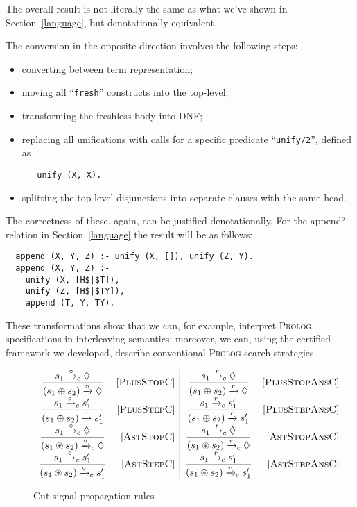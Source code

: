 {The overall result is not literally the same as what we've shown in Section~\ref{language}, but denotationally equivalent.

The conversion in the opposite direction involves the following steps:

\begin{itemize}
  \item converting between term representation;
  \item moving all ``\lstinline|fresh|'' constructs into the top-level;
  \item transforming the freshless body into DNF;
  \item replacing all unifications with calls for a specific predicate ``\lstinline|unify/2|'', defined as

\begin{lstlisting}
   unify (X, X).
\end{lstlisting}    

  \item splitting the top-level disjunctions into separate clauses with the same head.
\end{itemize}

The correctness of these, again, can be justified denotationally. For the append$^o$ relation in Section~\ref{language} the result
will be as follows:

\begin{lstlisting}
  append (X, Y, Z) :- unify (X, []), unify (Z, Y).
  append (X, Y, Z) :-
    unify (X, [H$|$T]),
    unify (Z, [H$|$TY]),
    append (T, Y, TY).
\end{lstlisting}

}

These transformations show that we can, for example, interpret \textsc{Prolog} specifications in interleaving semantics; moreover, we can,
using the certified framework we developed, describe conventional \textsc{Prolog} search strategies.

\begin{figure*}
\[
\begin{array}{cr|cr}
  \dfrac{s_1 \xrightarrow{\circ}_c \Diamond}{(s_1 \oplus s_2) \xrightarrow{\circ} \Diamond} & \mbox{[\textsc{PlusStopC}]}&
  \dfrac{s_1 \xrightarrow{r}_c \Diamond}{(s_1 \oplus s_2) \xrightarrow{r} \Diamond} & \mbox{[\textsc{PlusStopAnsC}]}\\
  \dfrac{s_1 \xrightarrow{\circ}_c s'_1}{(s_1 \oplus s_2) \xrightarrow{\circ} s'_1} &\mbox{[\textsc{PlusStepC}]}&
  \dfrac{s_1 \xrightarrow{r}_c s'_1}{(s_1 \oplus s_2) \xrightarrow{r} s'_1} &\mbox{[\textsc{PlusStepAnsC}]}\\
  \dfrac{s_1 \xrightarrow{\circ}_c \Diamond}{(s_1 \circledast s_2) \xrightarrow{\circ}_c \Diamond} & \mbox{[\textsc{AstStopC}]}&
  \dfrac{s_1 \xrightarrow{r}_c \Diamond}{(s_1 \circledast s_2) \xrightarrow{r}_c \Diamond} & \mbox{[\textsc{AstStopAnsC}]}\\
  \dfrac{s_1 \xrightarrow{\circ}_c s'_1}{(s_1 \circledast s_2) \xrightarrow{\circ}_c s'_1} &\mbox{[\textsc{AstStepC}]}&
  \dfrac{s_1 \xrightarrow{r}_c s'_1}{(s_1 \circledast s_2) \xrightarrow{r}_c s'_1} &\mbox{[\textsc{AstStepAnsC}]}
\end{array}
\]
\caption{Cut signal propagation rules}
\label{cut-signal-propagation}
\end{figure*}

